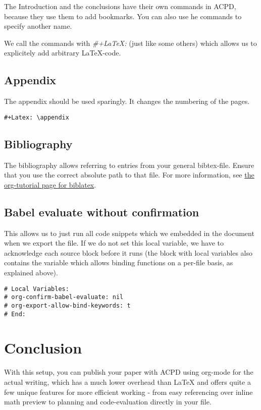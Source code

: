 \documentclass[11pt]{article}
\begin{document}
The Introduction and the conclusions have their own commands in ACPD, because they use them to add bookmarks. You can also use he commands to specify another name.

We call the commands with \emph{\#+\LaTeX{}:} (just like some others) which allows us to explicitely add arbitrary \LaTeX{}-code. 

\subsection*{Appendix}
\label{sec-3-6}

The appendix should be used sparingly. It changes the numbering of the pages.

\begin{verbatim}
#+Latex: \appendix
\end{verbatim}

\subsection*{Bibliography}
\label{sec-3-7}

The bibliography allows referring to entries from your general bibtex-file. Ensure that you use the correct absolute path to that file. For more information, see \href{http://orgmode.org/worg/org-tutorials/org-latex-export.html#sec-17-1}{the org-tutorial page for biblatex}.

\subsection*{Babel evaluate without confirmation}
\label{sec-3-8}

This allows us to just run all code snippets which we embedded in the document when we export the file. If we do not set this local variable, we have to acknowledge each source block before it runs (the block with local variables also contains the variable which allows binding functions on a per-file basis, as explained above).

\begin{verbatim}
# Local Variables:
# org-confirm-babel-evaluate: nil
# org-export-allow-bind-keywords: t
# End:
\end{verbatim}

\section*{Conclusion}
\label{sec-4}

With this setup, you can publish your paper with ACPD using org-mode for the actual writing, which has a much lower overhead than \LaTeX{} and offers quite a few unique features for more efficient working - from easy referencing over inline math preview to planning and code-evaluation directly in your file.


{}
\end{document}
